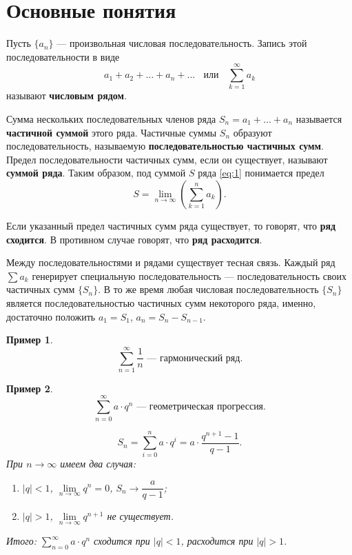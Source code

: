 \documentclass[12pt]{report}
\newtheorem{example}{Пример}
\newcommand\abs[1]{\left|#1\right|}
\begin{document}
\section{Основные понятия}
Пусть $\{a_n\}$ --- произвольная числовая последовательность. Запись этой последовательности в виде
\begin{equation} a_1 + a_2 + \ldots + a_n + \ldots~~~~\text{или}~~~~\sum_{k=1}^{\infty}a_k \end{equation} \label{eq:1}
называют \textbf{числовым рядом}.

Сумма нескольких последовательных членов ряда $S_n = a_1 + \ldots + a_n$ называется \textbf{частичной суммой} этого ряда. Частичные суммы $S_n$ образуют последовательность, называемую \textbf{последовательностью частичных сумм}. Предел последовательности частичных сумм, если он существует, называют \textbf{суммой ряда}. Таким образом, под суммой $S$ ряда \eqref{eq:1} понимается предел
\[ S = \lim_{n \to \infty} \left( \sum_{k=1}^{n} a_k \right).\]

Если указанный предел частичных сумм ряда существует, то говорят, что \textbf{ряд сходится}. В противном случае говорят, что \textbf{ряд расходится}.

Между последовательностями и рядами существует тесная связь. Каждый ряд $\sum a_k$ генерирует специальную последовательность --- последовательность своих частичных сумм $\{ S_n \}$. В то же время любая числовая последовательность $\{ S_n \}$ является последовательностью частичных сумм некоторого ряда, именно, достаточно положить $a_1 = S_1$, $a_n = S_n - S_{n-1}$.

\begin{example} \label{ex:1}
\[ \sum_{n = 1}^{\infty} \frac{1}{n} \text{ --- гармонический ряд.}\]
\end{example}

\begin{example} \label{ex:2}
\[ \sum_{n = 0}^{\infty} a \cdot q^n \text{ --- геометрическая прогрессия.} \]

\[S_n = \sum_{i=0}^{n} a \cdot q^i = a \cdot \frac{q^{n+1} - 1}{q - 1}.\]
При $n \to \infty$ имеем два случая:
\begin{enumerate}
\item $\abs{q} < 1$, $\lim\limits_{n \to \infty} q^n = 0$, $S_n \to \dfrac{a}{q - 1}$;
\item $\abs{q} > 1$, $\lim\limits_{n \to \infty} q^{n+1}$ не существует.
\end{enumerate}
Итого: $\sum\limits_{n = 0}^{\infty} a \cdot q ^n$ сходится при $\abs{q} < 1$, расходится при $\abs{q} > 1$.
\end{example}
\end{document}
